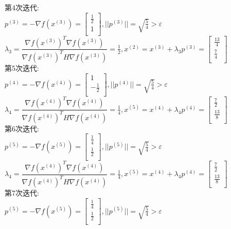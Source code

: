 \begin{solution}
第4次迭代:\\
$p^{(3)}=-\nabla f(x^{(3)})=\begin{bmatrix} \frac{1}{2}\\1\\\end{bmatrix},||p^{(3)}||=\sqrt{\frac{5}{4}}>\varepsilon$\\
$\lambda_3=\dfrac{\nabla f(x^{(3)})^T\nabla f(x^{(3)})}{\nabla f(x^{(3)})^TH\nabla f(x^{(3)})}=\frac{1}{2},x^{(2)}=x^{(3)}+\lambda_3p^{(3)}=\begin{bmatrix} \frac{13}{4}\\\frac{7}{4}\\\end{bmatrix}$\\
第5次迭代:\\
$p^{(4)}=-\nabla f(x^{(4)})=\begin{bmatrix} 1\\-\frac{1}{2}\\\end{bmatrix},||p^{(4)}||=\sqrt{\frac{5}{4}}>\varepsilon$\\
$\lambda_4=\dfrac{\nabla f(x^{(4)})^T\nabla f(x^{(4)})}{\nabla f(x^{(4)})^TH\nabla f(x^{(4)})}=\frac{1}{4},x^{(5)}=x^{(4)}+\lambda_4p^{(4)}=\begin{bmatrix} \frac{7}{2}\\\frac{13}{8}\\\end{bmatrix}$\\
第6次迭代:\\
$p^{(5)}=-\nabla f(x^{(5)})=\begin{bmatrix} \frac{1}{4}\\\frac{1}{2}\\\end{bmatrix},||p^{(5)}||=\sqrt{\frac{5}{4}}>\varepsilon$\\
$\lambda_4=\dfrac{\nabla f(x^{(4)})^T\nabla f(x^{(4)})}{\nabla f(x^{(4)})^TH\nabla f(x^{(4)})}=\frac{1}{4},x^{(5)}=x^{(4)}+\lambda_4p^{(4)}=\begin{bmatrix} \frac{7}{2}\\\frac{13}{8}\\\end{bmatrix}$\\
第7次迭代:\\
$p^{(5)}=-\nabla f(x^{(5)})=\begin{bmatrix} \frac{1}{4}\\\frac{1}{2}\\\end{bmatrix},||p^{(5)}||=\sqrt{\frac{5}{4}}>\varepsilon$\\

\end{solution}
